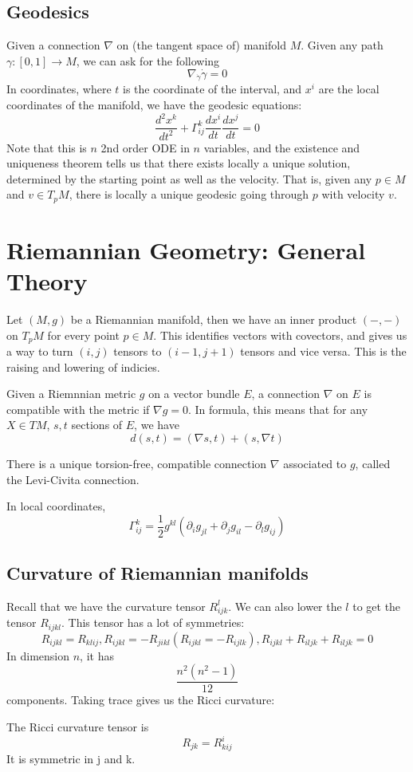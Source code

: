 \documentclass[main.tex]{subfiles}
\begin{document}
\subsection{Geodesics}
Given a connection $\nabla$ on (the tangent space of) manifold $M$. Given any path $\gamma: [0,1] \rightarrow M$, we can ask for the following
$$
\nabla_{\dot{\gamma}} \dot{\gamma} = 0
$$
In coordinates, where $t$ is the coordinate of the interval, and $x^i$ are the local coordinates of the manifold, we have the geodesic equations:
$$
\frac{d^2 x^k}{dt ^2} + \Gamma_{ij}^k \frac{dx^i}{dt} \frac{dx^j}{dt} = 0
$$
Note that this is $n$ 2nd order ODE in $n$ variables, and the existence and uniqueness theorem tells us that there exists locally a unique solution, determined by the starting point as well as the velocity. That is, given any $p \in M$ and $v \in T_p M$, there is locally a unique geodesic going through $p$ with velocity $v$.
\section{Riemannian Geometry: General Theory}
Let $(M, g)$ be a Riemannian manifold, then we have an inner product 
$(-,-)$ on $T_p M$ for every point $p \in M$. This identifies vectors with covectors, and gives us a way to turn $(i, j)$ tensors to $(i-1, j+1)$ tensors and vice versa. This is the raising and lowering of indicies.

Given a Riemnnian metric $g$ on a vector bundle $E$, a connection $\nabla$ on $E$ is compatible with the metric if $\nabla g = 0$. In formula, this means that for any $X \in TM$, $s, t$ sections of $E$, we have 
$$
d(s,t) = (\nabla s, t) + (s, \nabla t)
$$

\begin{definition}
There is a unique torsion-free, compatible connection $\nabla$ associated to $g$, called the Levi-Civita connection.
\end{definition}
In local coordinates, 
$$
\Gamma_{ij}^k = \frac{1}{2} g^{kl}(\partial_i g_{jl} + \partial_j g_{il} - \partial_l g_{ij})
$$

\subsection{Curvature of Riemannian manifolds}
Recall that we have the curvature tensor $R_{ijk}^l$. We can also lower the $l$ to get the tensor $R_{ijkl}$. This tensor has a lot of symmetries:
$$
R_{ijkl} = R_{klij}, R_{ijkl} = -R_{jikl} (R_{ijkl} = - R_{ijlk}), R_{ijkl} + R_{iljk} + R_{iljk} = 0
$$
In dimension $n$, it has 
$$
\frac{n^2 (n^2 - 1)}{12}
$$
components.
Taking trace gives us the Ricci curvature:
\begin{definition}
The Ricci curvature tensor is 
$$
R_{jk} = R^i _{kij}
$$
It is symmetric in j and k. 
\end{definition}
\end{document}
